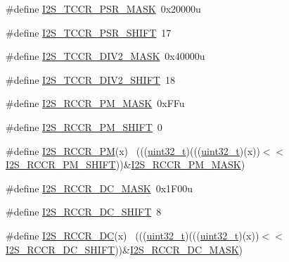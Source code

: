 \begin{DoxyCompactItemize}
\item 
\#define \hyperlink{group___i2_s___register___masks_ga46921bd1d04eecda321a3a4351873c6d}{I2\+S\+\_\+\+T\+C\+C\+R\+\_\+\+P\+S\+R\+\_\+\+M\+A\+SK}~0x20000u
\item 
\#define \hyperlink{group___i2_s___register___masks_ga3baf1e4363a90d3a67215d9b97e345bf}{I2\+S\+\_\+\+T\+C\+C\+R\+\_\+\+P\+S\+R\+\_\+\+S\+H\+I\+FT}~17
\item 
\#define \hyperlink{group___i2_s___register___masks_gae4465b3a62ec4867381835cbcfe2ef9d}{I2\+S\+\_\+\+T\+C\+C\+R\+\_\+\+D\+I\+V2\+\_\+\+M\+A\+SK}~0x40000u
\item 
\#define \hyperlink{group___i2_s___register___masks_ga3610b2d932b677f0f16603e04d0ea2d1}{I2\+S\+\_\+\+T\+C\+C\+R\+\_\+\+D\+I\+V2\+\_\+\+S\+H\+I\+FT}~18
\item 
\#define \hyperlink{group___i2_s___register___masks_gad95811918cc638479521d5b955e53cf0}{I2\+S\+\_\+\+R\+C\+C\+R\+\_\+\+P\+M\+\_\+\+M\+A\+SK}~0x\+F\+Fu
\item 
\#define \hyperlink{group___i2_s___register___masks_gaca293dbc9aa012c12c7e17e9f2e7ff8c}{I2\+S\+\_\+\+R\+C\+C\+R\+\_\+\+P\+M\+\_\+\+S\+H\+I\+FT}~0
\item 
\#define \hyperlink{group___i2_s___register___masks_ga2a40ca3cb3cb50b2bd8ba1c95a0b11ef}{I2\+S\+\_\+\+R\+C\+C\+R\+\_\+\+PM}(x)                                                  ~(((\hyperlink{_p_e___types_8h_a33594304e786b158f3fb30289278f5af}{uint32\+\_\+t})(((\hyperlink{_p_e___types_8h_a33594304e786b158f3fb30289278f5af}{uint32\+\_\+t})(x))$<$$<$\hyperlink{group___i2_s___register___masks_gaca293dbc9aa012c12c7e17e9f2e7ff8c}{I2\+S\+\_\+\+R\+C\+C\+R\+\_\+\+P\+M\+\_\+\+S\+H\+I\+FT}))\&\hyperlink{group___i2_s___register___masks_gad95811918cc638479521d5b955e53cf0}{I2\+S\+\_\+\+R\+C\+C\+R\+\_\+\+P\+M\+\_\+\+M\+A\+SK})
\item 
\#define \hyperlink{group___i2_s___register___masks_ga68bc20b5db6b0887dad82a4e75289f2c}{I2\+S\+\_\+\+R\+C\+C\+R\+\_\+\+D\+C\+\_\+\+M\+A\+SK}~0x1\+F00u
\item 
\#define \hyperlink{group___i2_s___register___masks_ga3f8fadf932d5085c79f7f6cc62ce68da}{I2\+S\+\_\+\+R\+C\+C\+R\+\_\+\+D\+C\+\_\+\+S\+H\+I\+FT}~8
\item 
\#define \hyperlink{group___i2_s___register___masks_ga7d8baec5868c78343a7e21d917470eb9}{I2\+S\+\_\+\+R\+C\+C\+R\+\_\+\+DC}(x)                                                  ~(((\hyperlink{_p_e___types_8h_a33594304e786b158f3fb30289278f5af}{uint32\+\_\+t})(((\hyperlink{_p_e___types_8h_a33594304e786b158f3fb30289278f5af}{uint32\+\_\+t})(x))$<$$<$\hyperlink{group___i2_s___register___masks_ga3f8fadf932d5085c79f7f6cc62ce68da}{I2\+S\+\_\+\+R\+C\+C\+R\+\_\+\+D\+C\+\_\+\+S\+H\+I\+FT}))\&\hyperlink{group___i2_s___register___masks_ga68bc20b5db6b0887dad82a4e75289f2c}{I2\+S\+\_\+\+R\+C\+C\+R\+\_\+\+D\+C\+\_\+\+M\+A\+SK})

\end{DoxyCompactItemize}
